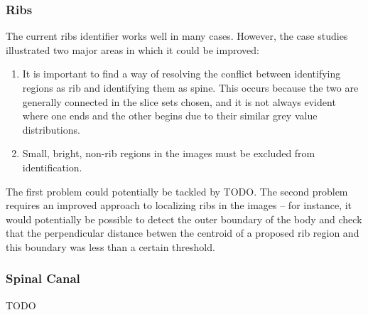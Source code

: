 \subsubsection{Ribs}

The current ribs identifier works well in many cases. However, the case studies illustrated two major areas in which it could be improved:
%
\begin{enumerate}

\item It is important to find a way of resolving the conflict between identifying regions as rib and identifying them as spine. This occurs because the two are generally connected in the slice sets chosen, and it is not always evident where one ends and the other begins due to their similar grey value distributions.
\item Small, bright, non-rib regions in the images must be excluded from identification.

\end{enumerate}
%
The first problem could potentially be tackled by TODO. The second problem requires an improved approach to localizing ribs in the images -- for instance, it would potentially be possible to detect the outer boundary of the body and check that the perpendicular distance betwen the centroid of a proposed rib region and this boundary was less than a certain threshold.

\subsubsection{Spinal Canal}

TODO

